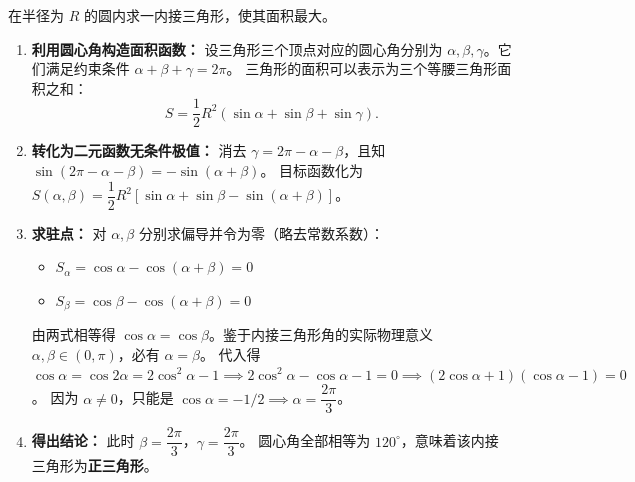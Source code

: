 \documentclass[lang=cn,11pt]{elegantbook}
\begin{document}
\begin{exercise}[几何极值寻优]
在半径为 $R$ 的圆内求一内接三角形，使其面积最大。
\end{exercise}
\begin{solution}
\begin{enumerate}
  \item \textbf{利用圆心角构造面积函数：}
  设三角形三个顶点对应的圆心角分别为 $\alpha, \beta, \gamma$。它们满足约束条件 $\alpha + \beta + \gamma = 2\pi$。
  三角形的面积可以表示为三个等腰三角形面积之和：
  \[ S = \frac{1}{2}R^2(\sin\alpha + \sin\beta + \sin\gamma). \]

  \item \textbf{转化为二元函数无条件极值：}
  消去 $\gamma = 2\pi - \alpha - \beta$，且知 $\sin(2\pi-\alpha-\beta) = -\sin(\alpha+\beta)$。
  目标函数化为 $S(\alpha, \beta) = \dfrac{1}{2}R^2 \left[ \sin\alpha + \sin\beta - \sin(\alpha+\beta) \right]$。

  \item \textbf{求驻点：}
  对 $\alpha, \beta$ 分别求偏导并令为零（略去常数系数）：
  \begin{itemize}
    \item $S_\alpha = \cos\alpha - \cos(\alpha+\beta) = 0$
    \item $S_\beta = \cos\beta - \cos(\alpha+\beta) = 0$
  \end{itemize}
  由两式相等得 $\cos\alpha = \cos\beta$。鉴于内接三角形角的实际物理意义 $\alpha, \beta \in (0, \pi)$，必有 $\alpha = \beta$。
  代入得 $\cos\alpha = \cos 2\alpha = 2\cos^2\alpha - 1 \implies 2\cos^2\alpha - \cos\alpha - 1 = 0 \implies (2\cos\alpha+1)(\cos\alpha-1) = 0$。
  因为 $\alpha \neq 0$，只能是 $\cos\alpha = -1/2 \implies \alpha = \dfrac{2\pi}{3}$。

  \item \textbf{得出结论：}
  此时 $\beta = \dfrac{2\pi}{3}$，$\gamma = \dfrac{2\pi}{3}$。
  圆心角全部相等为 $120^\circ$，意味着该内接三角形为\textbf{正三角形}。
\end{enumerate}
\end{solution}
\end{document}
